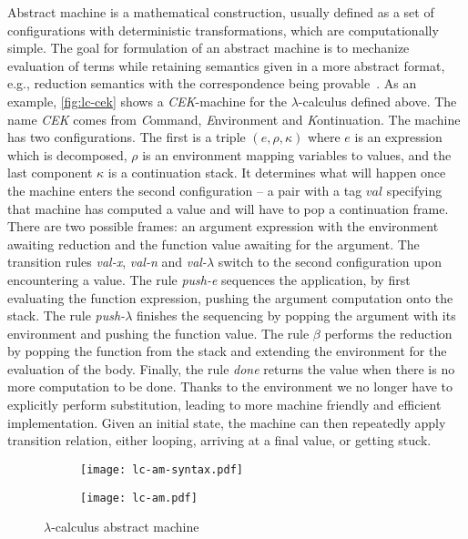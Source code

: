 \documentclass[inz, english, longabstract]{iithesis}
\newcommand{\LC}{\(\lambda\)-calculus}
\begin{document}
Abstract machine is a mathematical construction, usually defined as a set of configurations with deterministic transformations, which are computationally simple.
The goal for formulation of an abstract machine is to mechanize evaluation of terms while retaining semantics given in a more abstract format, e.g., reduction semantics with the correspondence being provable~\cite{Felleisen2009}.
As an example, \autoref{fig:lc-cek} shows a \emph{CEK}-machine for the \LC{} defined above.
The name \emph{CEK} comes from \emph{C}ommand, \emph{E}nvironment and \emph{K}ontinuation.
The machine has two configurations.
The first is a triple $ (e, \rho, \kappa) $ where $ e $ is an expression which is decomposed, $ \rho $ is an environment mapping variables to values, and the last component $ \kappa $ is a continuation stack.
It determines what will happen once the machine enters the second configuration -- a pair with a tag $val$ specifying that machine has computed a value and will have to pop a continuation frame.
There are two possible frames: an argument expression with the environment awaiting reduction and the function value awaiting for the argument.
The transition rules \textit{val-x}, \textit{val-n} and \textit{val-$\lambda$} switch to the second configuration upon encountering a value.
The rule \textit{push-e} sequences the application, by first evaluating the function expression, pushing the argument computation onto the stack.
The rule \textit{push-$\lambda$} finishes the sequencing by popping the argument with its environment and pushing the function value.
The rule \textit{$\beta$} performs the reduction by popping the function from the stack and extending the environment for the evaluation of the body.
Finally, the rule \textit{done} returns the value when there is no more computation to be done.
Thanks to the environment we no longer have to explicitly perform substitution, leading to more machine friendly and efficient implementation.
Given an initial state, the machine can then repeatedly apply transition relation, either looping, arriving at a final value, or getting stuck. 
\begin{figure}
  \centering
  \begin{subfigure}{0.3\textwidth}
    \texttt{[image: lc-am-syntax.pdf]}
  \end{subfigure}
  \begin{subfigure}{0.69\textwidth}
    \texttt{[image: lc-am.pdf]}
  \end{subfigure}
  \caption{\LC{} abstract machine}
  \label{fig:lc-cek}
\end{figure}
\end{document}
